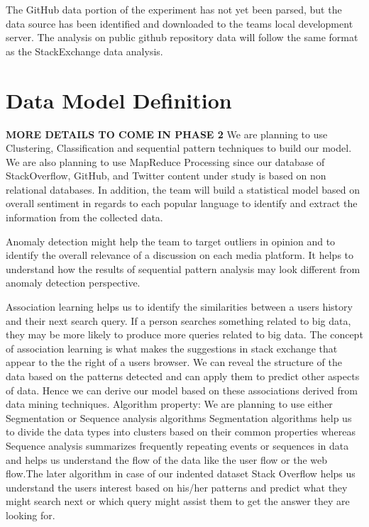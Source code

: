 \documentclass{sig-alternate}
\begin{document}
The GitHub data portion of the experiment has not yet been parsed, but the data source has been identified and downloaded to the team\textsc{}s local development server. The analysis on public github repository data will follow the same format as the StackExchange data analysis.

\section{Data Model Definition}
\label{Data Model Definition}

\textbf{MORE DETAILS TO COME IN PHASE 2}
We are planning to use Clustering, Classification and sequential pattern techniques to build our model. We are also planning to use MapReduce Processing since our database of StackOverflow, GitHub, and Twitter content under study is based on non relational databases. In addition, the team will build a statistical model based on overall sentiment in regards to each popular language to identify and extract the information from the collected data. 

Anomaly detection might help the team to target outliers in opinion and to identify the overall relevance of a discussion on each media platform. It helps to understand how the results of sequential pattern analysis may look different from anomaly detection perspective. 

Association learning helps us to identify the similarities between a user\textsc{}s history and their next search query. If a person searches something related to big data, they may be more likely to produce more queries related to big data. The concept of association learning is what makes the suggestions in stack exchange that appear to the the right of a user\textsc{}s browser. We can reveal the structure of the data based on the patterns detected and can apply them to predict other aspects of data. Hence we can derive our model based on these associations derived from data mining techniques. 
Algorithm property:
We are planning to use  either Segmentation or Sequence analysis algorithms  Segmentation algorithms help us to divide the data types into clusters based on their common properties whereas Sequence analysis summarizes frequently repeating events or sequences in data and helps us understand the flow of the data like the user flow or the web flow.The later algorithm in case of our indented dataset Stack Overflow helps us understand the user\textsc{}s interest based on his/her patterns and predict what they might search next or which query might assist them to get the answer they are looking for. 
\end{document}

